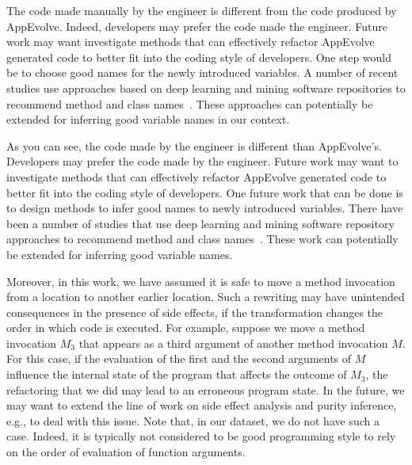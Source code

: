 The code made manually by the engineer is different from the code produced
by AppEvolve. Indeed, developers may prefer the code made the
engineer. Future work may want investigate methods that can effectively
refactor AppEvolve generated code to better fit into the coding style of
developers. One step would be to choose good names for the newly introduced
variables. A number of recent studies use approaches based on deep learning
and mining software repositories to recommend method and class
names~\cite{allamanis2015suggesting}. These approaches can potentially be extended for inferring good
variable names in our context.

As you can see, the code made by the engineer is different than AppEvolve's. Developers may prefer the code made by the engineer. Future work may want to investigate methods that can effectively refactor AppEvolve generated code to better fit into the coding style of developers. One future work that can be done is to design methods to infer good names to newly introduced variables. There have been a number of studies that use deep learning and mining software repository approaches to recommend method and class names~\cite{allamanis2015suggesting}. These work can potentially be extended for inferring good variable names.


Moreover, in this work, we have assumed it is safe to move a method
invocation from a location to another earlier location. Such a rewriting
may have unintended consequences in the presence of side effects, if the
transformation changes the order in which code is executed.  For example,
suppose we move a method invocation $M_3$ that appears as a third argument
of another method invocation $M$. For this case, if the evaluation of the
first and the second arguments of $M$ influence the internal state of the
program that affects the outcome of $M_3$, the refactoring that we did may
lead to an erroneous program state. In the future, we may want to extend
the line of work on side effect analysis and purity inference, e.g., to
deal with this issue. Note that, in our dataset, we do not have such a
case.  Indeed, it is typically not considered to be good programming style
to rely on the order of evaluation of function arguments.





